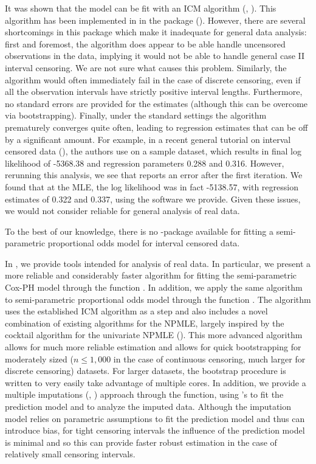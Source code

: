 \documentclass[article]{jss}
\begin{document}
	It was shown that the model can be fit with an ICM algorithm (\cite{basicICM}, \cite{coxphICM}). This algorithm has been implemented in  in the package  (\cite{intcox}). However, there are several shortcomings in this package which make it inadequate for general data analysis: first and foremost, the algorithm does appear to be able handle uncensored observations in the data, implying it would not be able to handle general case II interval censoring. We are not sure what causes this problem. Similarly, the algorithm would often immediately fail in the case of discrete censoring, even if all the observation intervals have strictly positive interval lengths. Furthermore, no standard errors are provided for the estimates (although this can be overcome via bootstrapping). Finally, under the standard settings the algorithm prematurely converges quite often, leading to regression estimates that can be off by a significant amount. For example, in a recent general tutorial on interval censored data (\cite{ic_tutorial}), the authors use  on a sample dataset, which results in final log likelihood of -5368.38 and regression parameters 0.288 and 0.316. However, rerunning this analysis, we see that  reports an error after the first iteration. We found that at the MLE, the log likelihood was in fact -5138.57, with regression estimates of 0.322 and 0.337, using the software we provide. Given these issues, we would not consider  reliable for general analysis of real data. 
	
	To the best of our knowledge, there is no -package available for fitting a semi-parametric proportional odds model for interval censored data. 
	 
	 In , we provide tools intended for analysis of real data. In particular, we present a more reliable and considerably faster algorithm for fitting the semi-parametric Cox-PH model through the function . In addition, we apply the same algorithm to semi-parametric proportional odds model through the function . The algorithm uses the established ICM algorithm as a step and also includes a novel combination of existing algorithms for the NPMLE, largely inspired by the cocktail algorithm for the univariate NPMLE (\cite{cocktail}). This more advanced algorithm allows for much more reliable estimation and allows for quick bootstrapping for moderately sized ($n \leq 1,000$ in the case of continuous censoring, much larger for discrete censoring) datasets. For larger datasets, the bootstrap procedure is written to very easily take advantage of multiple cores. In addition, we provide a multiple imputations (\cite{rubinMI}, \cite{panMI}) approach through the  function, using 's  to fit the prediction model and  to analyze the imputed data. Although the imputation model relies on parametric assumptions to fit the prediction model and thus can introduce bias, for tight censoring intervals the influence of the prediction model is minimal and so this can provide faster robust estimation in the case of relatively small censoring intervals. 
	 
\end{document}
